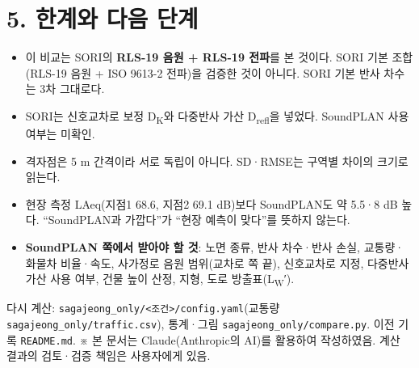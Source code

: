 \documentclass[10pt,a4paper]{article}
\newcommand{\f}[1]{\texttt{#1}}
\newcommand{\hl}[1]{\textbf{#1}}
\begin{document}
\section*{5. 한계와 다음 단계}
\begin{itemize}
\item 이 비교는 SORI의 \hl{RLS-19 음원 + RLS-19 전파}를 본 것이다. SORI 기본 조합(RLS-19 음원 + ISO 9613-2 전파)을 검증한 것이 아니다. SORI 기본 반사 차수는 3차 그대로다.
\item SORI는 신호교차로 보정 D\textsubscript{K}와 다중반사 가산 D\textsubscript{refl}을 넣었다. SoundPLAN 사용 여부는 미확인.
\item 격자점은 5 m 간격이라 서로 독립이 아니다. SD·RMSE는 구역별 차이의 크기로 읽는다.
\item 현장 측정 LAeq(지점1 68.6, 지점2 69.1 dB)보다 SoundPLAN도 약 5.5·8 dB 높다. “SoundPLAN과 가깝다”가 “현장 예측이 맞다”를 뜻하지 않는다.
\item \hl{SoundPLAN 쪽에서 받아야 할 것}: 노면 종류, 반사 차수·반사 손실, 교통량·화물차 비율·속도, 사가정로 음원 범위(교차로 쪽 끝), 신호교차로 지정, 다중반사 가산 사용 여부, 건물 높이 산정, 지형, 도로 방출표(L\textsubscript{W}′).
\end{itemize}

\vspace{2mm}
{\footnotesize 다시 계산: \f{sagajeong\_only/<조건>/config.yaml}(교통량 \f{sagajeong\_only/traffic.csv}), 통계·그림 \f{sagajeong\_only/compare.py}. 이전 기록 \f{README.md}. ※ 본 문서는 Claude(Anthropic의 AI)를 활용하여 작성하였음. 계산 결과의 검토·검증 책임은 사용자에게 있음.}
\end{document}
